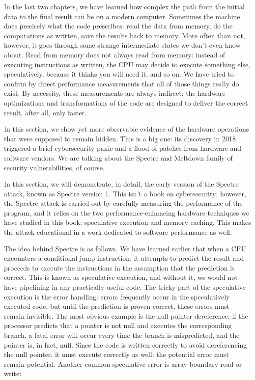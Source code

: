 
In the last two chapters, we have learned how complex the path from the initial data to the final result can be on a modern computer. Sometimes the machine does precisely what the code prescribes: read the data from memory, do the computations as written, save the results back to memory. More often than not, however, it goes through some strange intermediate states we don't even know about. Read from memory does not always read from memory: instead of executing instructions as written, the CPU may decide to execute something else, speculatively, because it thinks you will need it, and so on. We have tried to confirm by direct performance measurements that all of those things really do exist. By necessity, these measurements are always indirect: the hardware optimizations and transformations of the code are designed to deliver the correct result, after all, only faster.

In this section, we show yet more observable evidence of the hardware operations that were supposed to remain hidden. This is a big one: its discovery in 2018 triggered a brief cybersecurity panic and a flood of patches from hardware and software vendors. We are talking about the Spectre and Meltdown family of security vulnerabilities, of course.


In this section, we will demonstrate, in detail, the early version of the Spectre attack, known as Spectre version 1. This isn't a book on cybersecurity; however, the Spectre attack is carried out by carefully measuring the performance of the program, and it relies on the two performance-enhancing hardware techniques we have studied in this book: speculative execution and memory caching. This makes the attack educational in a work dedicated to software performance as well.

The idea behind Spectre is as follows. We have learned earlier that when a CPU encounters a conditional jump instruction, it attempts to predict the result and proceeds to execute the instructions in the assumption that the prediction is correct. This is known as speculative execution, and without it, we would not have pipelining in any practically useful code. The tricky part of the speculative execution is the error handling: errors frequently occur in the speculatively executed code, but until the prediction is proven correct, these errors must remain invisible. The most obvious example is the null pointer dereference: if the processor predicts that a pointer is not null and executes the corresponding branch, a fatal error will occur every time the branch is mispredicted, and the pointer is, in fact, null. Since the code is written correctly to avoid dereferencing the null pointer, it must execute correctly as well: the potential error must remain potential. Another common speculative error is array boundary read or write:

